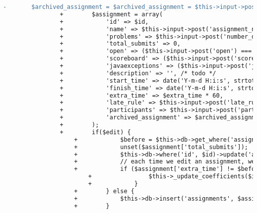 \begin{lstlisting}[language=diff, caption=Perubahan pada kode Assignment\_model.php]
				-		$archived_assignment = $archived_assignment = $this->input->post('archived_assignment')!==NULL ? 1 : 0;
				+        $assignment = array(
				+            'id' => $id,
				+            'name' => $this->input->post('assignment_name'),
				+            'problems' => $this->input->post('number_of_problems'),
				+            'total_submits' => 0,
				+            'open' => ($this->input->post('open') === null ? 0 : 1),
				+            'scoreboard' => ($this->input->post('scoreboard') === null ? 0 : 1),
				+            'javaexceptions' => ($this->input->post('javaexceptions') === null ? 0 : 1),
				+            'description' => '', /* todo */
				+            'start_time' => date('Y-m-d H:i:s', strtotime($this->input->post('start_time'))),
				+            'finish_time' => date('Y-m-d H:i:s', strtotime($this->input->post('finish_time'))),
				+            'extra_time' => $extra_time * 60,
				+            'late_rule' => $this->input->post('late_rule'),
				+            'participants' => $this->input->post('participants'),
				+            'archived_assignment' => $archived_assignment
				+        );
				+        if($edit) {
					+            $before = $this->db->get_where('assignments', array('id' => $id))->row_array();
					+            unset($assignment['total_submits']);
					+            $this->db->where('id', $id)->update('assignments', $assignment);
					+            // each time we edit an assignment, we should update coefficient of all submissions of that assignment
					+            if ($assignment['extra_time'] != $before['extra_time'] or $assignment['start_time'] != $before['start_time'] or $assignment['finish_time'] != $before['finish_time'] or $assignment['late_rule'] != $before['late_rule']) {
						+                $this->_update_coefficients($id, $assignment['extra_time'], $assignment['finish_time'], $assignment['late_rule']);
						+            }
					+        } else {
					+            $this->db->insert('assignments', $assignment);
					+        }
				

\end{lstlisting}
